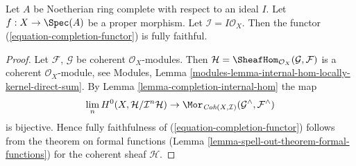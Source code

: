 \begin{lemma}
\label{lemma-fully-faithful}
Let $A$ be Noetherian ring complete with respect to an ideal $I$.
Let $f : X \to \Spec(A)$ be a proper morphism. Let
$\mathcal{I} = I\mathcal{O}_X$.
Then the functor (\ref{equation-completion-functor}) is fully faithful.
\end{lemma}

\begin{proof}
Let $\mathcal{F}$, $\mathcal{G}$ be coherent $\mathcal{O}_X$-modules.
Then $\mathcal{H} = \SheafHom_{\mathcal{O}_X}(\mathcal{G}, \mathcal{F})$
is a coherent $\mathcal{O}_X$-module, see
Modules, Lemma \ref{modules-lemma-internal-hom-locally-kernel-direct-sum}.
By Lemma \ref{lemma-completion-internal-hom} the map
$$
\lim_n H^0(X, \mathcal{H}/\mathcal{I}^n\mathcal{H})
\to
\Mor_{\textit{Coh}(X, \mathcal{I})}
(\mathcal{G}^\wedge, \mathcal{F}^\wedge)
$$
is bijective. Hence fully faithfulness of
(\ref{equation-completion-functor}) follows from the theorem on formal
functions (Lemma \ref{lemma-spell-out-theorem-formal-functions})
for the coherent sheaf $\mathcal{H}$.
\end{proof}
